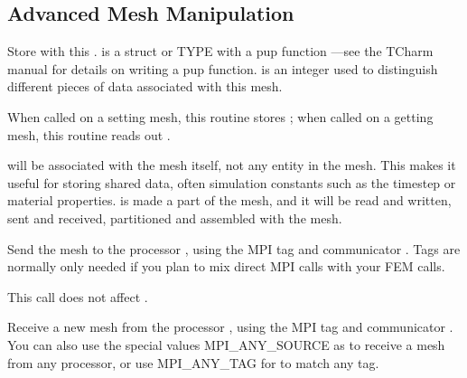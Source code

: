 \subsection{Advanced Mesh Manipulation}


Store  with this .   is a struct or TYPE
with a pup function ---see the TCharm manual for details 
on writing a pup function.
 is an integer used to distinguish different pieces of data
associated with this mesh.

When called on a setting mesh, this routine stores ;
when called on a getting mesh, this routine reads out .

 will be associated with the mesh itself, not any 
entity in the mesh.  This makes it useful for storing shared
data, often simulation constants such as the timestep or material 
properties.   is made a part of the mesh, and it will be 
read and written, sent and received, partitioned and assembled
with the mesh.


  
  Send the mesh  to the processor , using
  the MPI tag  and communicator .
  Tags are normally only needed if you plan to mix direct MPI
  calls with your FEM calls.
  
  This call does not affect .
  

  
  Receive a new mesh from the processor , using
  the MPI tag  and communicator .
  You can also use the special values MPI\_ANY\_SOURCE as 
  to receive a mesh from any processor, or use
  MPI\_ANY\_TAG for  to match any tag.

